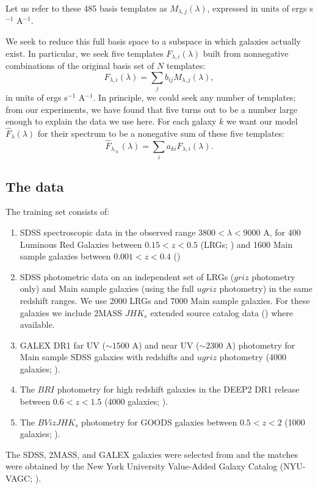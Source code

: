 \documentclass[10pt,preprint]{aastex}
\renewcommand{\AA}{A}
\begin{document}
Let us refer to these 485 basis templates as $M_{\lambda,
j}(\lambda)$, expressed in units of ergs s$^{-1}$ \AA$^{-1}$.

We seek to reduce this full basis space to a subspace in which
galaxies actually exist. In particular, we seek five templates
$F_{\lambda, i}(\lambda)$ built from nonnegative combinations of the
original basis set of $N$ templates:
\begin{equation}
F_{\lambda, i}(\lambda) = \sum_j b_{ij} M_{\lambda, j}(\lambda),
\end{equation}
in units of ergs s$^{-1}$ \AA$^{-1}$. In principle, we could seek any
number of templates; from our experiments, we have found that five
turns out to be a number large enough to explain the data we use
here. For each galaxy $k$ we want our model
${\hat{F}_\lambda}(\lambda)$ for their spectrum to be a nonegative sum
of these five templates:
\begin{equation}
{\hat{F}}_{\lambda,_k}(\lambda) = \sum_i a_{ki} F_{\lambda,i}(\lambda).
\end{equation}

\subsection{The data}

The training set consists of:
\begin{enumerate}
\item SDSS spectroscopic data in the observed range $3800 < \lambda <
9000$ \AA, for 400 Luminous Red Galaxies between $0.15 < z < 0.5$ (LRGs;
\citealt{eisenstein01a}) and 1600 Main sample galaxies between $0.001
< z < 0.4$ (\citealt{strauss02a})
\item SDSS photometric data on an independent set of LRGs ($griz$
photometry only) and Main sample galaxies (using the full $ugriz$
photometry) in the same redshift ranges. We use 2000 LRGs and 7000
Main sample galaxies.  For these galaxies we include 2MASS $JHK_s$
extended source catalog data (\citealt{jarrett00a}) where available.
\item GALEX DR1 far UV ($\sim 1500$ \AA) and near UV ($\sim 2300$ \AA)
photometry for Main sample SDSS galaxies with redshifts and $ugriz$
photometry (4000 galaxies; \citealt{martin05a}).
\item The $BRI$ photometry for high redshift galaxies in the DEEP2 
DR1 release between $0.6 < z < 1.5$ (4000
galaxies; \citealt{davis03a, faber03a}).
\item The $BVizJHK_s$ photometry for GOODS galaxies between $0.5 < z < 2$ (1000
galaxies; \citealt{giavalisco04a}).
\end{enumerate}
The SDSS, 2MASS, and GALEX galaxies were selected from and the matches
were obtained by the New York University Value-Added Galaxy Catalog
(NYU-VAGC;
\citealt{blanton05a}).  
\end{document}
